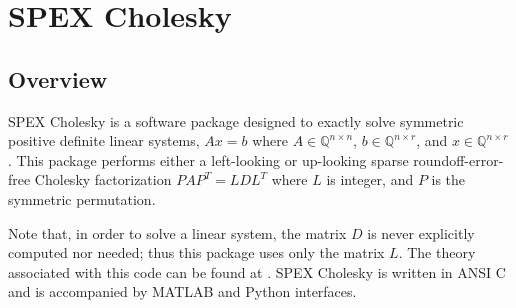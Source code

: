 \documentclass[12pt]{report}
\theoremstyle{definition}
\begin{document}
\begin{comment}
\item \verb|example2.c|: This example reads in a matrix stored in triplet
format from the \verb|ExampleMats| folder. Additionally, it reads in a
right hand side vector from this folder and solves the associated linear system
via the \verb|SPEX_Left_LU_backslash| function, and, the solution is given as a matrix
of rational numbers.

\item \verb|spexlu_demo.c|: This example reads in a matrix and right hand side
vector from a file and solves the linear system $A x = b$
using the techniques discussed in Section \ref{s:Using:expert}. This file also
allows command line arguments (discussed in \verb|README.md|) and can be used
to replicate the results from \cite{lourenco2019exact}.

\end{itemize}
\end{comment}



\chapter{SPEX Cholesky} \label{ch:Chol}

\section{Overview} \label{s:Chol:intro}
SPEX Cholesky is a software package designed to exactly solve symmetric positive definite
linear systems, $A x = b$ where $A \in \mathbb{Q}^{n \times
n}$, $b \in \mathbb{Q}^{n \times r}$, and $x \in \mathbb{Q}^{n \times
r}$. This package performs either a left-looking or up-looking sparse
roundoff-error-free Cholesky factorization $P A P^T =  L D L^T$ where $L$ is integer,
and $P$ is the symmetric permutation.

Note that, in order to solve a linear system, the matrix $D$ is never explicitly computed nor needed; thus this package uses only the matrix $L$. The theory associated with this code can be found at
 \cite{lourenco2022exactly}. SPEX Cholesky is written in ANSI C and is accompanied by MATLAB and Python interfaces.
 
\end{document}
